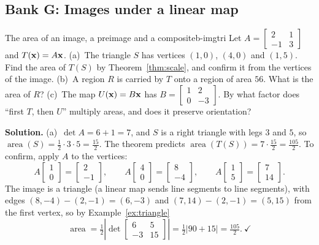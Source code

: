 \documentclass[11pt]{article}
\begin{document}
\subsection*{Bank G: Images under a linear map}

\begin{exmp}{The area of an image, a preimage and a composite}{b-imgtri}
Let $A=\begin{bmatrix}2&1\\-1&3\end{bmatrix}$ and $T(\mathbf{x})=A\mathbf{x}$. (a)~The triangle $S$ has vertices $(1,0)$, $(4,0)$ and $(1,5)$. Find the area of $T(S)$ by Theorem~\ref{thm:scale}, and confirm it from the vertices of the image. (b)~A region $R$ is carried by $T$ onto a region of area $56$. What is the area of $R$? (c)~The map $U(\mathbf{x})=B\mathbf{x}$ has $B=\begin{bmatrix}1&2\\0&-3\end{bmatrix}$. By what factor does ``first $T$, then $U$'' multiply areas, and does it preserve orientation?

\textbf{Solution.} (a)~$\det A=6+1=7$, and $S$ is a right triangle with legs $3$ and $5$, so $\operatorname{area}(S)=\tfrac12\cdot3\cdot5=\tfrac{15}2$. The theorem predicts $\operatorname{area}(T(S))=7\cdot\tfrac{15}2=\tfrac{105}2$. To confirm, apply $A$ to the vertices:
\[
A\begin{bmatrix}1\\0\end{bmatrix}=\begin{bmatrix}2\\-1\end{bmatrix},\qquad
A\begin{bmatrix}4\\0\end{bmatrix}=\begin{bmatrix}8\\-4\end{bmatrix},\qquad
A\begin{bmatrix}1\\5\end{bmatrix}=\begin{bmatrix}7\\14\end{bmatrix}.
\]
The image is a triangle (a linear map sends line segments to line segments), with edges $(8,-4)-(2,-1)=(6,-3)$ and $(7,14)-(2,-1)=(5,15)$ from the first vertex, so by Example~\ref{ex:triangle}
\[
\operatorname{area}=\tfrac12\left|\det\begin{bmatrix}6&5\\-3&15\end{bmatrix}\right|=\tfrac12|90+15|=\tfrac{105}2.\ \checkmark
\]


\end{exmp}
\end{document}
